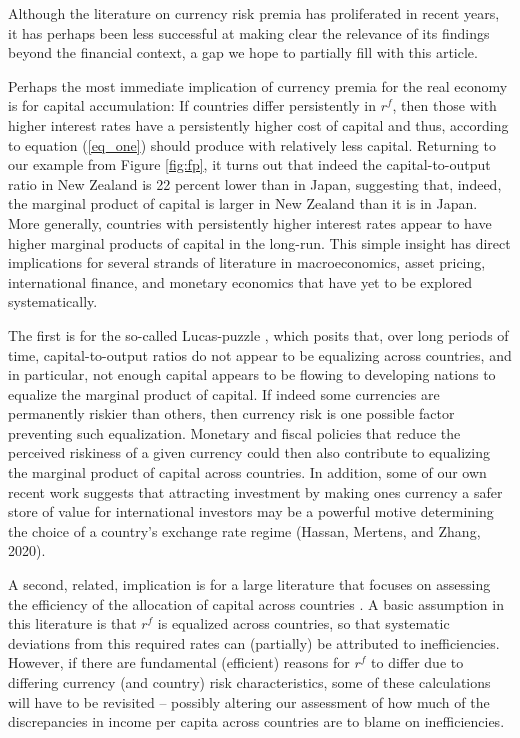 \documentclass{ar-1col}
\begin{document}
Although the literature on currency risk premia has proliferated in
recent years, it has perhaps been less successful at making clear the
relevance of its findings beyond the financial context, a gap we hope
to partially fill with this article.

Perhaps the most immediate implication of currency premia for the real
economy is for capital accumulation: If countries differ persistently
in $r^f$, then those with higher interest rates have a persistently
higher cost of capital and thus, according to equation (\ref{eq_one}) 
should produce with relatively less capital. Returning to our example from
Figure \ref{fig:fp}, it turns out that indeed the capital-to-output
ratio in New Zealand is 22 percent lower than in Japan, suggesting
that, indeed, the marginal product of capital is larger in New Zealand
than it is in Japan. More generally, countries with persistently
higher interest rates appear to have higher marginal products of
capital in the long-run. This simple insight has direct implications
for several strands of literature in macroeconomics, asset pricing,  international finance, and monetary economics that have yet to be explored systematically.

The first is for the so-called Lucas-puzzle \citep{Lucas1990}, which
posits that, over long periods of time, capital-to-output ratios do
not appear to be equalizing across countries, and in particular, not
enough capital appears to be flowing to developing nations to equalize
the marginal product of capital. If indeed some currencies are
permanently riskier than others, then currency risk is one possible
factor preventing such equalization. Monetary and fiscal policies that reduce the perceived riskiness of a given currency could then also contribute to equalizing the marginal product of capital across countries. In addition, some of our own recent work suggests that attracting investment by making ones currency a safer store of value for international investors may be a powerful motive determining the choice of a country's exchange rate regime (Hassan, Mertens, and Zhang, 2020).

A second, related, implication is for a large literature that focuses
on assessing the efficiency of the allocation of capital across
countries \citep{HallJones1997, CaselliFeyrer2007}. A basic assumption
in this literature is that $r^f$ is equalized across countries, so
that systematic deviations from this required rates can (partially) be
attributed to inefficiencies. However, if there are fundamental
(efficient) reasons for $r^f$ to differ due to differing currency (and
country) risk characteristics, some of these calculations will have to
be revisited -- possibly altering our assessment of how much of the discrepancies in income per capita across countries are to blame on inefficiencies.
\end{document}
